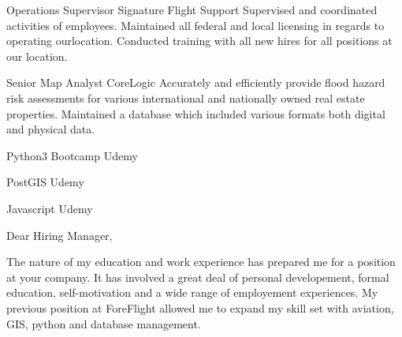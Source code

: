 \documentclass[letterpaper]{ReadableCV}
\begin{document}
{Operations Supervisor}
{Signature Flight Support}
{Supervised and coordinated activities of employees. Maintained all federal and local licensing in regards to operating ourlocation. Conducted training with all new hires for all positions at our location.}


{Senior Map Analyst}
{CoreLogic}
{Accurately and efficiently provide flood hazard risk assessments for various international and nationally owned real estate properties. Maintained a database which included various formats both digital and physical data.}



{Python3 Bootcamp}
{Udemy}{}

{PostGIS}
{Udemy}{}

{Javascript}
{Udemy}{}

         
          
\clearpage
 
 
\showHeader




\makeLetter

Dear Hiring Manager,

\bigskip

The nature of my education and work experience has prepared me for a position at your company. It has involved a great deal of personal developement, formal education, self-motivation and a wide range of employement experiences. My previous position at ForeFlight allowed me to expand my skill set with aviation, GIS, python and database management. 
\end{document}
